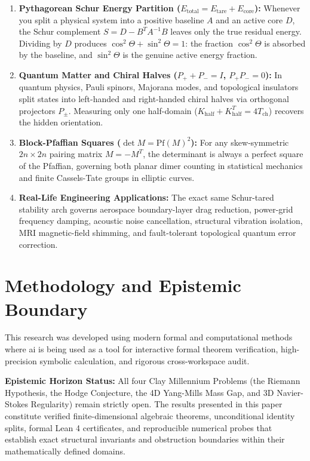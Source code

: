 \documentclass[11pt,a4paper]{article}
\theoremstyle{definition}
\begin{document}
\begin{enumerate}
  \item \textbf{Pythagorean Schur Energy Partition ($E_{\mathrm{total}} = E_{\mathrm{tare}} + E_{\mathrm{core}}$):} Whenever you split a physical system into a positive baseline $A$ and an active core $D$, the Schur complement $S = D - B^T A^{-1} B$ leaves only the true residual energy. Dividing by $D$ produces $\cos^2\Theta + \sin^2\Theta = 1$: the fraction $\cos^2\Theta$ is absorbed by the baseline, and $\sin^2\Theta$ is the genuine active energy fraction.
  \item \textbf{Quantum Matter and Chiral Halves ($P_+ + P_- = I$, $P_+ P_- = 0$):} In quantum physics, Pauli spinors, Majorana modes, and topological insulators split states into left-handed and right-handed chiral halves via orthogonal projectors $P_\pm$. Measuring only one half-domain ($K_{\mathrm{half}} + K_{\mathrm{half}}^T = 4 T_{\mathrm{ch}}$) recovers the hidden orientation.
  \item \textbf{Block-Pfaffian Squares ($\det M = \mathrm{Pf}(M)^2$):} For any skew-symmetric $2n \times 2n$ pairing matrix $M = -M^T$, the determinant is always a perfect square of the Pfaffian, governing both planar dimer counting in statistical mechanics and finite Cassels-Tate groups in elliptic curves.
  \item \textbf{Real-Life Engineering Applications:} The exact same Schur-tared stability arch governs aerospace boundary-layer drag reduction, power-grid frequency damping, acoustic noise cancellation, structural vibration isolation, MRI magnetic-field shimming, and fault-tolerant topological quantum error correction.
\end{enumerate}

\section{Methodology and Epistemic Boundary}
\noindent This research was developed using modern formal and computational methods where ai is being used as a tool for interactive formal theorem verification, high-precision symbolic calculation, and rigorous cross-workspace audit.

\vspace{0.5em}
\noindent\textbf{Epistemic Horizon Status:} All four Clay Millennium Problems (the Riemann Hypothesis, the Hodge Conjecture, the 4D Yang-Mills Mass Gap, and 3D Navier-Stokes Regularity) remain strictly open. The results presented in this paper constitute verified finite-dimensional algebraic theorems, unconditional identity splits, formal Lean 4 certificates, and reproducible numerical probes that establish exact structural invariants and obstruction boundaries within their mathematically defined domains.
\end{document}
